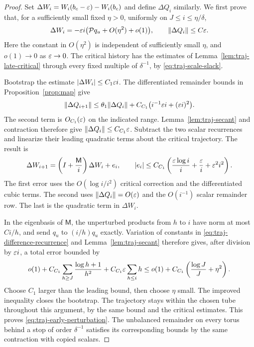 \begin{proof}
Set
\(\Delta W_i=W_i(b_c-\varepsilon)-W_i(b_c)\) and define
\(\Delta Q_i\) similarly.  We first prove that, for a sufficiently
small fixed \(\eta>0\), uniformly on
\(J\le i\le\eta/\delta\),
\begin{equation}\label{eq:traj-early-perturbation}
 \Delta W_i=-\varepsilon i\bigl(\mathcal Pq_u+O(\eta^2)+o(1)\bigr),
 \qquad \|\Delta Q_i\|\le C\varepsilon.
\end{equation}
Here the constant in \(O(\eta^2)\) is independent of sufficiently
small \(\eta\), and \(o(1)\to0\) as \(\varepsilon\to0\).
The critical history has the estimates of
Lemma~\ref{lem:traj-late-critical} through every fixed multiple of
\(\delta^{-1}\), by \eqref{eq:traj-scale-slack}.

Bootstrap the estimate \(|\Delta W_i|\le C_1\varepsilon i\).
The differentiated remainder bounds in
Proposition~\ref{prop:map} give
\[
 \|\Delta Q_{i+1}\|
 \le\theta_1\|\Delta Q_i\|
       +C_{C_1}\bigl(i^{-1}\varepsilon i+(\varepsilon i)^2\bigr).
\]
The second term is \(O_{C_1}(\varepsilon)\) on the indicated range.
Lemma~\ref{lem:traj-secant} and contraction therefore give
\(\|\Delta Q_i\|\le C_{C_1}\varepsilon\).
Subtract the two scalar recurrences and linearize their leading
quadratic terms about the critical trajectory.  The result is
\begin{equation}\label{eq:traj-difference-recurrence}
 \Delta W_{i+1}
       =\left(I+\frac{\mathsf M}{i}\right)\Delta W_i+e_i,
 \qquad
 |e_i|\le C_{C_1}\left(
          \frac{\varepsilon\log i}{i}+\frac{\varepsilon} i+\varepsilon^2i^2\right).
\end{equation}
The first error uses the \(O(\log i/i^2)\) critical correction
and the differentiated cubic terms.  The second uses
\(\|\Delta Q_i\|=O(\varepsilon)\) and the \(O(i^{-1})\) scalar
remainder row.  The last is the quadratic term in \(\Delta W_i\).

In the eigenbasis of \(\mathsf M\), the unperturbed products from
\(h\) to \(i\) have norm at most \(Ci/h\), and send \(q_u\)
to \((i/h)q_u\) exactly.  Variation of constants in
\eqref{eq:traj-difference-recurrence} and
Lemma~\ref{lem:traj-secant} therefore gives, after division by
\(\varepsilon i\), a total error bounded by
\[
 o(1)+C_{C_1}\sum_{h\ge J}\frac{\log h+1}{h^2}
           +C_{C_1}\varepsilon\sum_{h\le i}h
 \le o(1)+C_{C_1}\left(\frac{\log J}{J}+\eta^2\right).
\]
Choose \(C_1\) larger than the leading bound, then choose
\(\eta\) small.  The improved inequality closes the bootstrap.
The trajectory stays within the chosen tube throughout this
argument, by the same bound and the critical estimates.
This proves \eqref{eq:traj-early-perturbation}.  The unbalanced
remainder on every torus behind a stop of order \(\delta^{-1}\)
satisfies its corresponding bounds by the same contraction with
copied scalars.


\end{proof}

